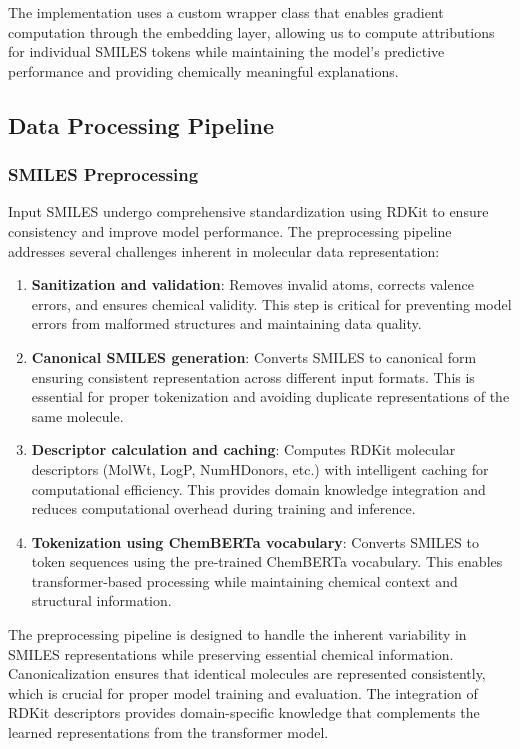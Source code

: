 \documentclass[preprint,12pt]{elsarticle}
\begin{document}
The implementation uses a custom wrapper class that enables gradient computation through the embedding layer, allowing us to compute attributions for individual SMILES tokens while maintaining the model's predictive performance and providing chemically meaningful explanations.

\subsection{Data Processing Pipeline}

\subsubsection*{SMILES Preprocessing}

Input SMILES undergo comprehensive standardization using RDKit to ensure consistency and improve model performance. The preprocessing pipeline addresses several challenges inherent in molecular data representation:

\begin{enumerate}
\item \textbf{Sanitization and validation}: Removes invalid atoms, corrects valence errors, and ensures chemical validity. This step is critical for preventing model errors from malformed structures and maintaining data quality.
\item \textbf{Canonical SMILES generation}: Converts SMILES to canonical form ensuring consistent representation across different input formats. This is essential for proper tokenization and avoiding duplicate representations of the same molecule.
\item \textbf{Descriptor calculation and caching}: Computes RDKit molecular descriptors (MolWt, LogP, NumHDonors, etc.) with intelligent caching for computational efficiency. This provides domain knowledge integration and reduces computational overhead during training and inference.
\item \textbf{Tokenization using ChemBERTa vocabulary}: Converts SMILES to token sequences using the pre-trained ChemBERTa vocabulary. This enables transformer-based processing while maintaining chemical context and structural information.
\end{enumerate}

The preprocessing pipeline is designed to handle the inherent variability in SMILES representations while preserving essential chemical information. Canonicalization ensures that identical molecules are represented consistently, which is crucial for proper model training and evaluation. The integration of RDKit descriptors provides domain-specific knowledge that complements the learned representations from the transformer model.
\end{document}
